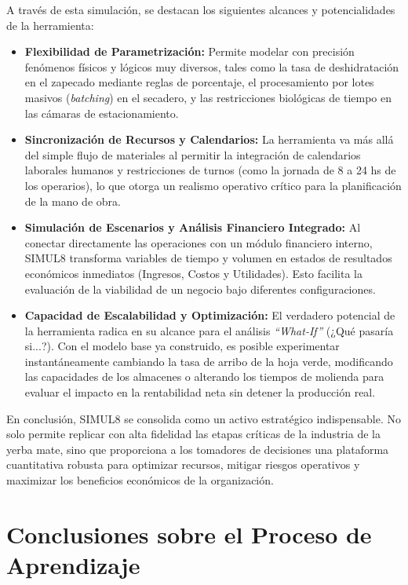 \documentclass[11pt, a4paper]{article}
\begin{document}
A través de esta simulación, se destacan los siguientes alcances y potencialidades de la herramienta:

\begin{itemize}
    \item \textbf{Flexibilidad de Parametrización:} Permite modelar con precisión fenómenos físicos y lógicos muy diversos, tales como la tasa de deshidratación en el zapecado mediante reglas de porcentaje, el procesamiento por lotes masivos (\textit{batching}) en el secadero, y las restricciones biológicas de tiempo en las cámaras de estacionamiento.
    \item \textbf{Sincronización de Recursos y Calendarios:} La herramienta va más allá del simple flujo de materiales al permitir la integración de calendarios laborales humanos y restricciones de turnos (como la jornada de 8 a 24 hs de los operarios), lo que otorga un realismo operativo crítico para la planificación de la mano de obra.
    \item \textbf{Simulación de Escenarios y Análisis Financiero Integrado:} Al conectar directamente las operaciones con un módulo financiero interno, SIMUL8 transforma variables de tiempo y volumen en estados de resultados económicos inmediatos (Ingresos, Costos y Utilidades). Esto facilita la evaluación de la viabilidad de un negocio bajo diferentes configuraciones.
    \item \textbf{Capacidad de Escalabilidad y Optimización:} El verdadero potencial de la herramienta radica en su alcance para el análisis \textit{``What-If''} (¿Qué pasaría si...?). Con el modelo base ya construido, es posible experimentar instantáneamente cambiando la tasa de arribo de la hoja verde, modificando las capacidades de los almacenes o alterando los tiempos de molienda para evaluar el impacto en la rentabilidad neta sin detener la producción real.
\end{itemize}

En conclusión, SIMUL8 se consolida como un activo estratégico indispensable. No solo permite replicar con alta fidelidad las etapas críticas de la industria de la yerba mate, sino que proporciona a los tomadores de decisiones una plataforma cuantitativa robusta para optimizar recursos, mitigar riesgos operativos y maximizar los beneficios económicos de la organización.

\section{Conclusiones sobre el Proceso de Aprendizaje}
\end{document}
